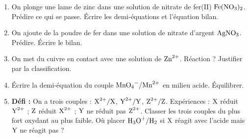 \documentclass[11pt]{article}
\begin{document}
\begin{exercice}
\begin{enumerate}
  \item On plonge une lame de zinc dans une solution de nitrate de fer(II) $\ce{Fe(NO3)2}$. Prédire ce qui se passe. Écrire les demi-équations et l'équation bilan.
  \item On ajoute de la poudre de fer dans une solution de nitrate d'argent $\ce{AgNO3}$. Prédire. Écrire le bilan.
  \item On met du cuivre en contact avec une solution de $\ce{Zn^2+}$. Réaction ? Justifier par la classification.
  \item Écrire la demi-équation du couple $\ce{MnO4-}/\ce{Mn^2+}$ en milieu acide. Équilibrer.
  \item \textbf{Défi :} On a trois couples : $\ce{X^2+}/\ce{X}$, $\ce{Y^2+}/\ce{Y}$, $\ce{Z^2+}/\ce{Z}$. Expériences : $\ce{X}$ réduit $\ce{Y^2+}$ ; $\ce{Z}$ réduit $\ce{X^2+}$ ; $\ce{Y}$ ne réduit pas $\ce{Z^2+}$. Classer les trois couples du plus fort oxydant au plus faible. Où placer $\ce{H3O+}/\ce{H2}$ si $\ce{X}$ réagit avec l'acide mais $\ce{Y}$ ne réagit pas ?
\end{enumerate}
\end{exercice}
\end{document}
